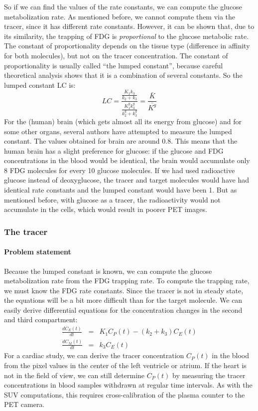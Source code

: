 So if we can find the values of the rate constants, we can compute the glucose
metabolization rate. As mentioned before, we cannot compute them via the
tracer, since it has different rate constants. However, it can be shown that,
due to its similarity, the trapping of FDG is {\em proportional} to the glucose
metabolic rate. The constant of proportionality depends on the tissue type
(difference in affinity for both molecules), but not on the tracer
concentration. The constant of proportionality is usually called ``the lumped
constant'', because careful theoretical analysis shows that it is a combination
of several constants. So the lumped constant LC is:
\begin{equation}
  LC = \frac{\frac{K_1 k_3}{k_2 + k_3}}{\frac{K_1^g k_3^g}{k_2^g + k_3^g}}
  = \frac{\bar{K}}{\bar{K^g}}
\end{equation}
For the (human) brain (which gets almost all its energy from glucose)
and for some other organs, several authors have attempted to measure
the lumped constant. The values obtained for brain are around
0.8. This means that the human brain has a slight preference for
glucose: if the glucose and FDG concentrations in the blood would be
identical, the brain would accumulate only 8 FDG molecules for every
10 glucose molecules. If we had used radioactive glucose instead of
deoxyglucose, the tracer and target molecules would have had identical
rate constants and the lumped constant would have been 1. But as
mentioned before, with glucose as a tracer, the radioactivity would
not accumulate in the cells, which would result in poorer PET images.

\subsubsection{The tracer}
\paragraph{Problem statement\\}
Because the lumped constant is known, we can compute the glucose
metabolization rate from the FDG trapping rate. To compute the trapping rate,
we must know the FDG rate constants. Since the tracer is not in steady state,
the equations will be a bit more difficult than for the target molecule.  We
can easily derive differential equations for the concentration changes in the
second and third compartment:
\begin{align}
  \frac{dC_E(t)}{dt} & = & K_1 C_P(t) - (k_2 + k_3) C_E(t) \label{eq:C_E}\\
  \frac{dC_M(t)}{dt} & = & k_3 C_E(t) \label{eq:C_M}
\end{align}
For a cardiac study, we can derive the tracer concentration $C_P(t)$ in the
blood from the pixel values in the center of the left ventricle or atrium. If
the heart is not in the field of view, we can still determine $C_P(t)$ by
measuring the tracer concentrations in blood samples withdrawn at regular time
intervals.  As with the SUV computations, this requires cross-calibration of
the plasma counter to the PET camera.

